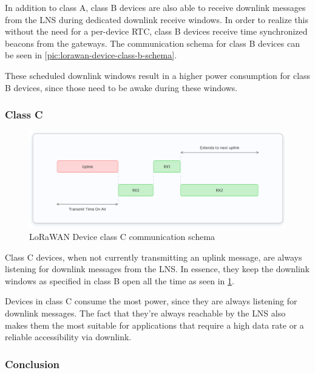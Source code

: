 In addition to class A, class B devices are also able to receive downlink messages from the \ac{LNS} during dedicated downlink receive windows.
In order to realize this without the need for a per-device \ac{RTC}, class B devices receive time synchronized beacons from the gateways.
The communication schema for class B devices can be seen in \cref{pic:lorawan-device-class-b-schema}.

These scheduled downlink windows result in a higher power consumption for class B devices, since those need to be awake during these windows.

\subsubsection{Class C}

\begin{figure}
    \centering
    \includegraphics[width=1\textwidth]{pictures/device-classes/class-c.png}
    \caption{\ac{LoRaWAN} Device class C communication schema~\protect\cite{the_things_industries_bv_device_nodate}}\label{pic:lorawan-device-class-c-schema}
\end{figure}

Class C devices, when not currently transmitting an uplink message, are always listening for downlink messages from the \ac{LNS}.
In essence, they keep the downlink windows as specified in class B open all the time as seen in \cref{pic:lorawan-device-class-c-schema}.

Devices in class C consume the most power, since they are always listening for downlink messages.
The fact that they're always reachable by the \ac{LNS} also makes them the most suitable for applications that require a high data rate or a reliable accessibility via downlink.

\subsubsection{Conclusion}


